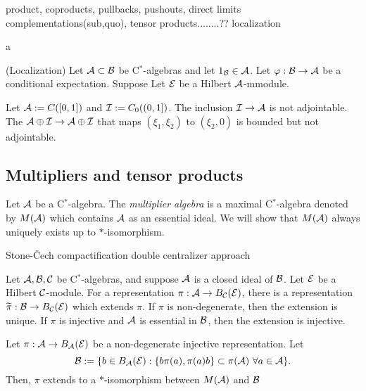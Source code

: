\documentclass{../../../small}
\begin{document}
\begin{ex}
product, coproducts, pullbacks, pushouts, direct limits
complementations(sub,quo), tensor products........??
localization
\begin{parts}
\item a
\item (Localization) 
Let $\mathcal{A}\subset\mathcal{B}$ be C$^*$-algebras and let $1_{\mathcal{B}}\in\mathcal{A}$.
Let $\varphi:\mathcal{B}\to\mathcal{A}$ be a conditional expectation.
Suppose 
Let $\mathcal{E}$ be a Hilbert $\mathcal{A}$-mmodule.
\end{parts}
\end{ex}

\begin{ex}
Let $\mathcal{A}:=C([0,1])$ and $\mathcal{I}:=C_0((0,1])$.
The inclusion $\mathcal{I}\to\mathcal{A}$ is not adjointable.
The $\mathcal{A}\oplus\mathcal{I}\to\mathcal{A}\oplus\mathcal{I}$ that maps $(\xi_1,\xi_2)$ to $(\xi_2,0)$ is bounded but not adjointable.
\end{ex}











\subsection{Multipliers and tensor products}

\begin{defn}
Let $\mathcal{A}$ be a C$^*$-algebra.
The \emph{multiplier algebra} is a maximal C$^*$-algebra denoted by $M(\mathcal{A})$ which contains $\mathcal{A}$ as an essential ideal.
We will show that $M(\mathcal{A})$ always uniquely exists up to $*$-isomorphism.
\end{defn}

Stone-\v Cech compactification
double centralizer approach


\begin{prop}
Let $\mathcal{A},\mathcal{B},\mathcal{C}$ be C$^*$-algebras, and suppose $\mathcal{A}$ is a closed ideal of $\mathcal{B}$.
Let $\mathcal{E}$ be a Hilbert $\mathcal{C}$-module.
For a representation $\pi:\mathcal{A}\to B_{\mathcal{C}}(\mathcal{E})$, there is a representation $\widetilde\pi:\mathcal{B}\to B_{\mathcal{C}}(\mathcal{E})$ which extends $\pi$.
If $\pi$ is non-degenerate, then the extension is unique.
If $\pi$ is injective and $\mathcal{A}$ is essential in $\mathcal{B}$, then the extension is injective.
\end{prop}

\begin{prop}
Let $\pi:\mathcal{A}\to B_{\mathcal{A}}(\mathcal{E})$ be a non-degenerate injective representation.
Let
\[\mathcal{B}:=\{b\in B_{\mathcal{A}}(\mathcal{E}):\{b\pi(a),\pi(a)b\}\subset\pi(\mathcal{A})\ \forall a\in\mathcal{A}\}.\]
Then, $\pi$ extends to a $*$-isomorphism between $M(\mathcal{A})$ and $\mathcal{B}$
\end{prop}
\end{document}
